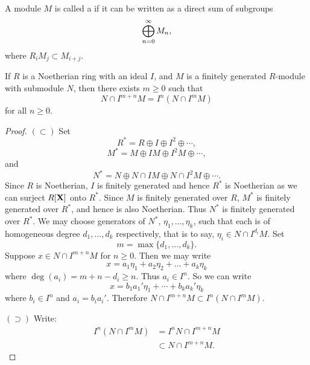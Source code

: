\documentclass{ximera}
\begin{document}
\begin{definition}
  A module $M$ is called a  if it can be written
  as a direct sum of subgroups
  \[
  \bigoplus_{n =0}^\infty M_n,
  \]
  where $R_iM_j \subset M_{i + j}$.
\end{definition}










\begin{theorem}\label{L:ArtinRees}
  If $R$ is a Noetherian ring with an ideal $I$, and $M$ is a finitely
  generated $R$-module with submodule $N$, then there exists $m\ge 0$
  such that
  \[
  N\cap I^{m+n}M = I^n(N\cap I^m M)
  \]
  for all $n\ge 0$.
  \begin{proof}
    $(\subset)$ Set
    \[
    R^* = R \oplus I \oplus I^2 \oplus \cdots,
    \]
    \[
    M^* = M \oplus IM \oplus I^2M \oplus \cdots,
    \]
    and
    \[
    N^* = N \oplus N \cap IM \oplus N \cap I^2M \oplus \cdots.
    \]
    Since $R$ is Noetherian, $I$ is finitely generated and hence $R^*$
    is Noetherian as we can surject $R[\mathbf X]$ onto $R^*$.  Since $M$ is
    finitely generated over $R$, $M^*$ is finitely generated over
    $R^*$, and hence is also Noetherian.  Thus $N^*$ is finitely
    generated over $R^*$.  We may choose generators of $N^*$,
    $\eta_1,\ldots,\eta_k$, such that each is of homogeneous degree
    $d_1,\ldots,d_k$ respectively, that is to say, $\eta_i\in N\cap
    I^{d_i}M$.  Set
    \[
    m = \max\{d_1,\dots, d_k \}.
    \]  
    Suppose $x \in N \cap I^{m+n}M$ for $n \ge 0$.  Then we may write 
    \[
    x =  a_1 \eta_1 + a_2 \eta_2 + \dots + a_k \eta_k
    \]
    where $\deg(a_i) = m + n - d_i \ge n$.  Thus $a_i \in I^n$.  So we can write
    \[
    x = b_1a_1'\eta_1 + \cdots + b_ka_k'\eta_k
    \]
    where $b_i \in I^n$ and $a_i = b_ia_i'$.  Therefore $N \cap I^{m + n}M
    \subset I^n(N \cap I^m M)$.

    $(\supset)$ Write:
    \begin{align*}
      I^n(N\cap I^m M) &= I^n N\cap I^{m+n} M\\
      &\subset N\cap I^{m+n}M.
    \end{align*}
  \end{proof}
\end{theorem}
\end{document}
